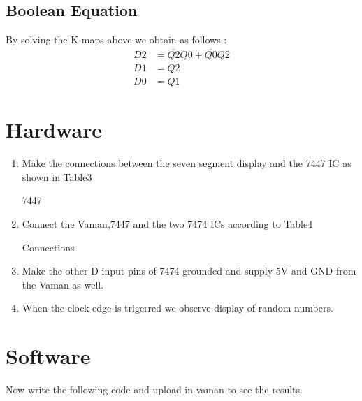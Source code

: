 \documentclass[10pt,a4paper]{article}
\begin{document}
\subsection{Boolean Equation}
By solving the K-maps above we obtain as follows :
\begin{align}
	D2 &= \overline{Q2}Q0 + \overline{Q0}Q2 \\
	D1 &= Q2 \\
	D0 &= Q1 
\end{align}
\section{Hardware}
\begin{enumerate}
\item Make the connections between the seven segment display and the 7447 IC as shown in Table3
\begin{table}[!h]                                
\centering
   
\caption{7447}                               
\label{table:7447}                       
\end{table}
\item Connect the Vaman,7447 and the two 7474 ICs according to Table4
\begin{table}[!h]                                 
\centering	
 
\caption{Connections}                                   
\label{table:connections}                       
\end{table}
\item Make the other D input pins of 7474 grounded and supply  5V and GND from the Vaman as well.
\item When the clock edge is trigerred we observe display of random numbers.
\end{enumerate}
\section{Software}
Now write the following code and upload in vaman to see the results.

\end{document}
